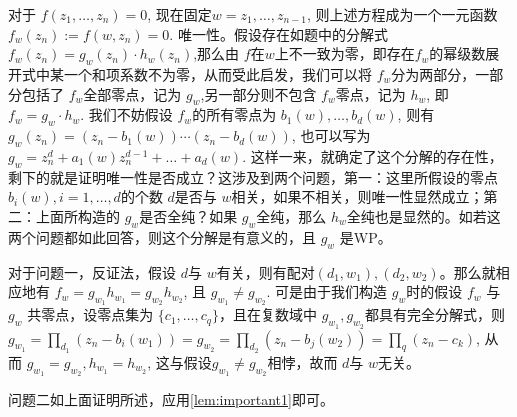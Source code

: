 \documentclass[lang=cn,12pt,fontset=none,a4paper]{beautybook}
\begin{document}
\begin{remark}
   对于 $f(z_1,\dots,z_n)=0$, 现在固定$w=z_1,\dots,z_{n-1}$, 则上述方程成为一个一元函数$f_w (z_n):=f(w,z_n)=0$. 唯一性。假设存在如题中的分解式 $f_w(z_n)=g_w(z_n)\cdot h_w(z_n)$,那么由 $f$在$w$上不一致为零，即存在$f_w$的幂级数展开式中某一个和项系数不为零，从而受此启发，我们可以将 $f_w$分为两部分，一部分包括了 $f_w$全部零点，记为 $g_w$,另一部分则不包含 $f_w$零点，记为 $h_w$, 即 $f_w=g_w\cdot h_w$. 我们不妨假设 $f_w$的所有零点为 $b_1(w),\dots,b_d(w)$, 则有 $g_w(z_n)=(z_n-b_1(w))\cdots (z_n-b_d(w))$, 也可以写为 $g_w=z_n^d+a_1(w) z_n^{d-1}+\dots+a_d(w)$. 这样一来，就确定了这个分解的存在性，剩下的就是证明唯一性是否成立？这涉及到两个问题，第一：这里所假设的零点 $b_i(w),i=1,\dots,d$的个数 $d$是否与 $w$相关，如果不相关，则唯一性显然成立；第二：上面所构造的 $g_w$是否全纯？如果 $g_w$全纯，那么 $h_w$全纯也是显然的。如若这两个问题都如此回答，则这个分解是有意义的，且 $g_w$ 是WP。

   对于问题一，反证法，假设 $d$与 $w$有关，则有配对$(d_1,w_1), (d_2,w_2)$。那么就相应地有 $f_w=g_{w_1} h_{w_1}=g_{w_2}h_{w_2}$, 且 $g_{w_1}\neq g_{w_2}$.  可是由于我们构造 $g_w$时的假设 $f_w$ 与 $g_w$ 共零点，设零点集为 $\{c_1,\dots,c_q\}$，且在复数域中 $g_{w_1},g_{w_2}$都具有完全分解式，则 $g_{w_1}=\prod_{d_1}(z_n-b_i(w_1))= g_{w_2}=\prod_{d_2}(z_n-b_j(w_2))=\prod_{q}(z_n-c_k)$, 从而 $g_{w_1}=g_{w_2}, h_{w_1}=h_{w_2}$, 这与假设$g_{w_1}\neq g_{w_2}$相悖，故而 $d$与 $w$无关。

   问题二如上面证明所述，应用\autoref{lem:important1}即可。
\end{remark}
\end{document}
